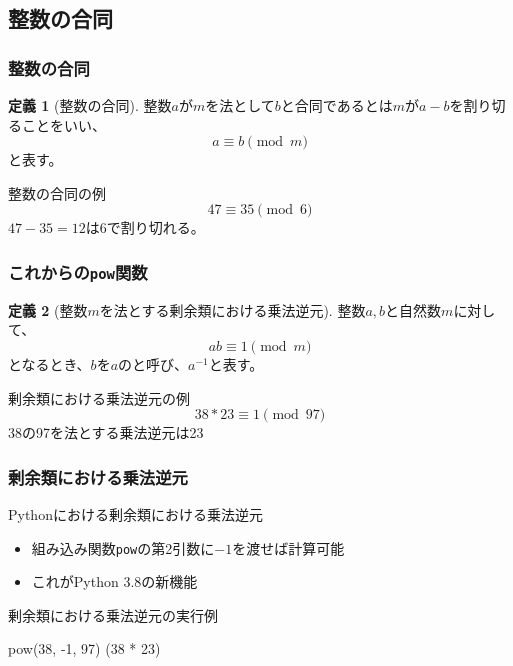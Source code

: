 \documentclass[aspectratio=169,dvipdfmx,14pt,notheorems]{beamer}
\theoremstyle{definition}
\newtheorem{definition}{定義}
\begin{document}
\subsection{整数の合同}

\begin{frame}\frametitle{整数の合同}

\begin{definition}[整数の合同]
整数$a$が$m$を法として$b$と合同であるとは$m$が$a-b$を割り切ることをいい、
\begin{equation*}
a \equiv b \pmod{m}
\end{equation*}
と表す。
\end{definition}

\begin{exampleblock}{整数の合同の例}
\begin{equation*}
47 \equiv 35 \pmod{6}
\end{equation*}
$47-35 = 12$は6で割り切れる。
\end{exampleblock}

\end{frame}

\begin{frame}\frametitle{これからの\texttt{pow}関数}

\begin{definition}[整数$m$を法とする剰余類における乗法逆元]
整数$a, b$と自然数$m$に対して、
\begin{equation*}
ab \equiv 1 \pmod{m}
\end{equation*}
となるとき、$b$を$a$のと呼び、$a^{-1}$と表す。
\end{definition}

\begin{exampleblock}{剰余類における乗法逆元の例}
\begin{equation*}
38 * 23 \equiv 1 \pmod{97}
\end{equation*}
38の97を法とする乗法逆元は23
\end{exampleblock}

\end{frame}

\begin{frame}[fragile]\frametitle{剰余類における乗法逆元}

\begin{block}{Pythonにおける剰余類における乗法逆元}
\begin{itemize}
\item 組み込み関数\texttt{pow}の第2引数に$-1$を渡せば計算可能
\item これがPython 3.8の新機能
\end{itemize}
\end{block}

\begin{exampleblock}{剰余類における乗法逆元の実行例}

\begin{pyconsole}
pow(38, -1, 97)
(38 * 23) %
\end{pyconsole}

\end{exampleblock}

\end{frame}
\end{document}

